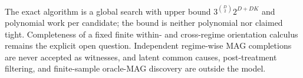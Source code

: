 The exact algorithm is a global search with upper bound \(3^{\binom D2}2^{D+DK}\) and polynomial work per candidate; the bound is neither polynomial nor claimed tight.  Completeness of a fixed finite within- and cross-regime orientation calculus remains the explicit open question.  Independent regime-wise MAG completions are never accepted as witnesses, and latent common causes, post-treatment filtering, and finite-sample oracle-MAG discovery are outside the model.